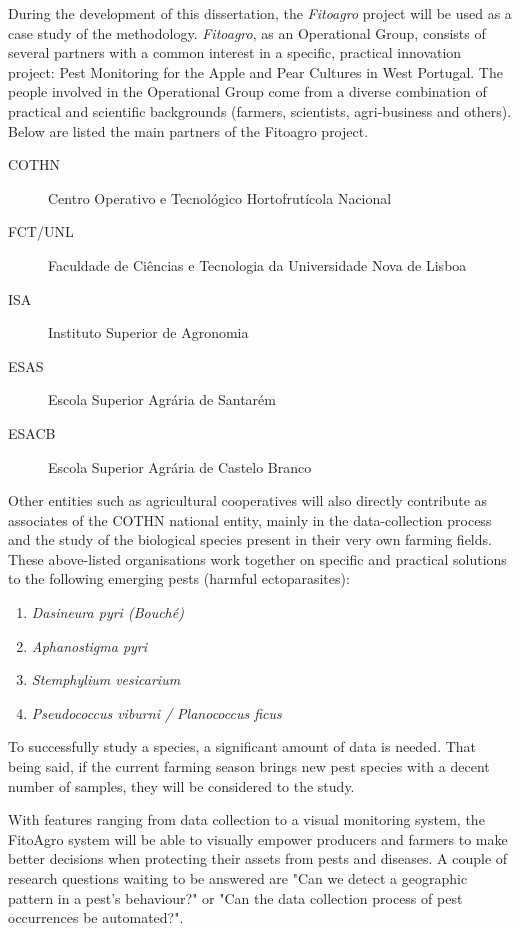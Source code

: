 During the development of this dissertation, the \emph{Fitoagro} project will be used as a case study of the methodology. \emph{Fitoagro}, as an Operational Group, consists of several partners with a common interest in a specific, practical innovation project: Pest Monitoring for the Apple and Pear Cultures in West Portugal. The people involved in the Operational Group come from a diverse combination of practical and scientific backgrounds (farmers, scientists, agri-business and others). Below are listed the main partners of the Fitoagro project.

\begin{description}
	\item [COTHN] Centro Operativo e Tecnológico Hortofrutícola Nacional
	\item [FCT/UNL] Faculdade de Ciências e Tecnologia da Universidade Nova de Lisboa
	\item [ISA] Instituto Superior de Agronomia
	\item [ESAS] Escola Superior Agrária de Santarém
	\item [ESACB] Escola Superior Agrária de Castelo Branco
\end{description}

Other entities such as agricultural cooperatives will also directly contribute as associates of the COTHN national entity, mainly in the data-collection process and the study of the biological species present in their very own farming fields. These above-listed organisations work together on specific and practical solutions to the following emerging pests (harmful ectoparasites):

\begin{enumerate}
	\item \textit{Dasineura pyri (Bouché)}
	\item \textit{Aphanostigma pyri}
	\item \textit{Stemphylium vesicarium}
	\item \textit{Pseudococcus viburni / Planococcus ficus}
\end{enumerate}

To successfully study a species, a significant amount of data is needed. That being said, if the current farming season brings new pest species with a decent number of samples, they will be considered to the study.

With features ranging from data collection to a visual monitoring system, the FitoAgro system will be able to visually empower producers and farmers to make better decisions when protecting their assets from pests and diseases. A couple of research questions waiting to be answered are "Can we detect a geographic pattern in a pest's behaviour?" or "Can the data collection process of pest occurrences be automated?". 

